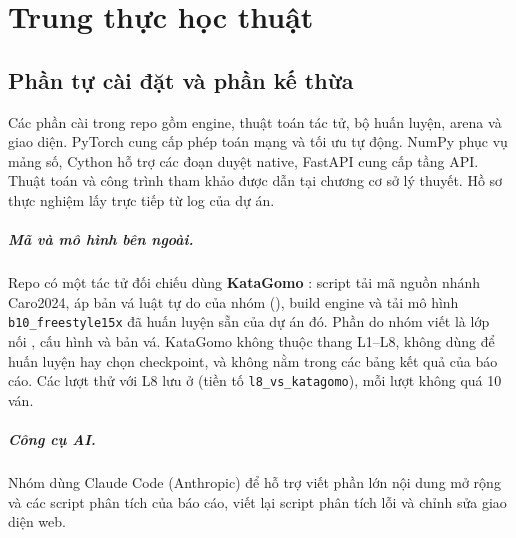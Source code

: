\chapter{Trung thực học thuật}
\label{app:trung-thuc}

\section{Phần tự cài đặt và phần kế thừa}
Các phần cài trong repo gồm engine, thuật toán tác tử, bộ huấn luyện, arena và giao diện.
PyTorch cung cấp phép toán mạng và tối ưu tự động. NumPy phục vụ mảng số, Cython hỗ trợ
các đoạn duyệt native, FastAPI cung cấp tầng API. Thuật toán và công trình tham khảo
được dẫn tại chương cơ sở lý thuyết. Hồ sơ thực nghiệm lấy trực tiếp từ log của dự án.

\paragraph{Mã và mô hình bên ngoài.} Repo có một tác tử đối chiếu dùng \textbf{KataGomo} \cite{katagomo}: script  tải mã nguồn nhánh Caro2024, áp bản vá luật tự do của nhóm (), build engine và tải mô hình \texttt{b10\_freestyle15x} đã huấn luyện sẵn của dự án đó. Phần do nhóm viết là lớp nối , cấu hình và bản vá. KataGomo không thuộc thang L1--L8, không dùng để huấn luyện hay chọn checkpoint, và không nằm trong các bảng kết quả của báo cáo. Các lượt thử với L8 lưu ở  (tiền tố \texttt{l8\_vs\_katagomo}), mỗi lượt không quá 10 ván.

\paragraph{Công cụ AI.} Nhóm dùng Claude Code (Anthropic) để hỗ trợ viết phần lớn nội dung mở rộng và các script phân tích của báo cáo, viết lại script phân tích lỗi và chỉnh sửa giao diện web.
